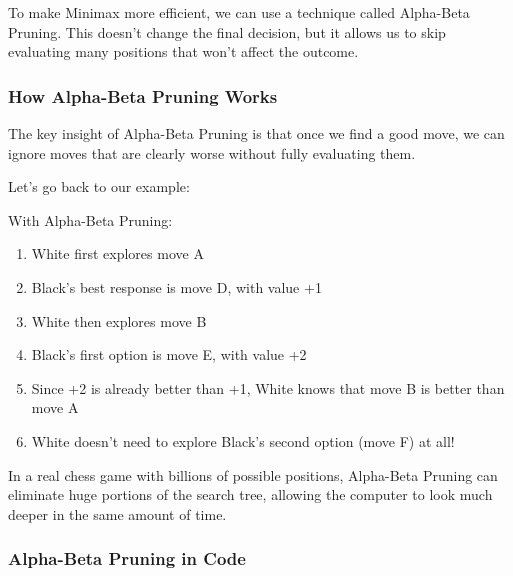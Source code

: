 \documentclass[11pt]{article}
\begin{document}
To make Minimax more efficient, we can use a technique called Alpha-Beta Pruning. This doesn't change the final decision, but it allows us to skip evaluating many positions that won't affect the outcome.

\subsubsection{How Alpha-Beta Pruning Works}

The key insight of Alpha-Beta Pruning is that once we find a good move, we can ignore moves that are clearly worse without fully evaluating them.

Let's go back to our example:

\begin{center}
\end{center}

With Alpha-Beta Pruning:
\begin{enumerate}
    \item White first explores move A
    \item Black's best response is move D, with value +1
    \item White then explores move B
    \item Black's first option is move E, with value +2
    \item Since +2 is already better than +1, White knows that move B is better than move A
    \item White doesn't need to explore Black's second option (move F) at all!
\end{enumerate}

In a real chess game with billions of possible positions, Alpha-Beta Pruning can eliminate huge portions of the search tree, allowing the computer to look much deeper in the same amount of time.

\subsubsection{Alpha-Beta Pruning in Code}
\end{document}
